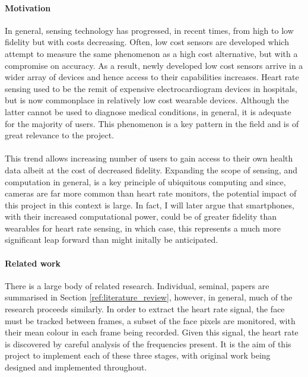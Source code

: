 \paragraph{Motivation}
In general, sensing technology has progressed, in recent times, from high to low fidelity but with costs decreasing.
Often, low cost sensors are developed which attempt to measure the same phenomenon as a high cost alternative, but with a compromise on accuracy.
As a result, newly developed low cost sensors arrive in a wider array of devices and hence access to their capabilities increases.
Heart rate sensing used to be the remit of expensive electrocardiogram devices in hospitals, but is now commonplace in relatively low cost wearable devices. Although the latter cannot be used to diagnose medical conditions, in general, it is adequate for the majority of users. This phenomenon
is a key pattern in the field and is of great relevance to the project.
\\\\
This trend allows increasing number of users to gain access to their own health data albeit at the cost of decreased fidelity.
Expanding the scope of sensing, and computation in general, is a key principle of ubiquitous computing and since, cameras are far more common than heart rate monitors, the potential impact of this project in this context is large. 
In fact, I will later argue that smartphones, with their increased computational power, 
could be of greater fidelity than wearables for heart rate sensing, in which case, this represents a much more significant 
leap forward than might initally be anticipated.

\paragraph{Related work}
There is a large body of related research.
Individual, seminal, papers are summarised in Section \ref{ref:literature_review}, however, in general, much of the research proceeds similarly. 
In order to extract the heart rate signal, the face must be tracked between frames, a subset of the face pixels are monitored, with their mean colour in each frame being recorded.
Given this signal, the heart rate is discovered by careful analysis of the frequencies present. 
It is the aim of this project to implement each of these three stages, with original work being designed and implemented throughout. 




